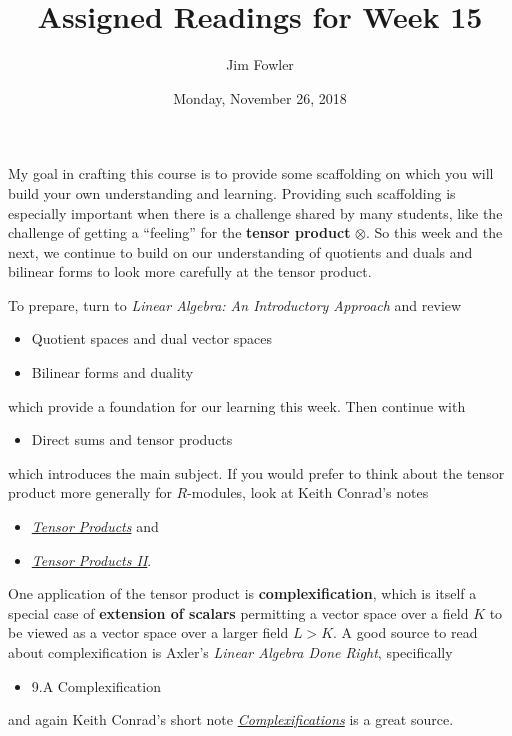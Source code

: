 \documentclass{homework}
\author{Jim Fowler}
\title{Assigned Readings for Week 15}
\date{Monday, November 26, 2018}
\begin{document}
\maketitle


My goal in crafting this course is to provide some scaffolding on
which you will build your own understanding and learning.  Providing
such scaffolding is especially important when there is a challenge
shared by many students, like the challenge of getting a ``feeling''
for the \textbf{tensor product} $\otimes$.  So this week and the next,
we continue to build on our understanding of quotients and duals and
bilinear forms to look more carefully at the tensor product.

To prepare, turn to \textit{Linear Algebra: An Introductory Approach}
and review
\begin{itemize}
\item {} Quotient spaces and dual vector spaces
\item {} Bilinear forms and duality
\end{itemize}
which provide a foundation for our learning this week.  Then continue
with
\begin{itemize}
\item {} Direct sums and tensor products
\end{itemize}
which introduces the main subject.  If you would prefer to think about the tensor product more generally for $R$-modules, look at Keith Conrad's notes
\begin{itemize}
\item \href{http://www.math.uconn.edu/~kconrad/blurbs/linmultialg/tensorprod.pdf}{\textit{Tensor Products}} and
\item \href{http://www.math.uconn.edu/~kconrad/blurbs/linmultialg/tensorprod2.pdf}{\textit{Tensor Products II}}.
\end{itemize}

One application of the tensor product is \textbf{complexification},
which is itself a special case of \textbf{extension of scalars}
permitting a vector space over a field $K$ to be viewed as a vector
space over a larger field $L > K$.  A good source to read about
complexification is Axler's \textit{Linear Algebra Done Right},
specifically
\begin{itemize}
\item \textsection 9.A Complexification
\end{itemize}
and again Keith Conrad's short note \href{http://www.math.uconn.edu/~kconrad/blurbs/linmultialg/complexification.pdf}{\textit{Complexifications}} is a great source.
\end{document}
